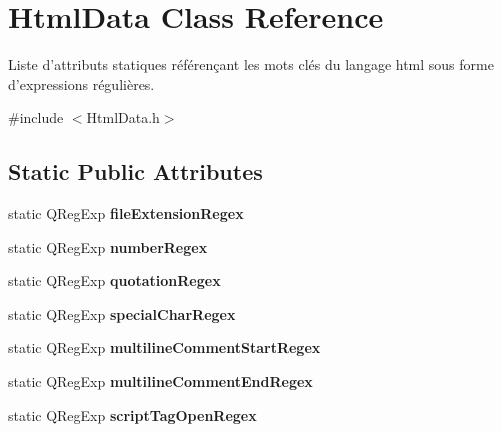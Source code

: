\hypertarget{class_html_data}{
\section{HtmlData Class Reference}
\label{class_html_data}
}


Liste d'attributs statiques référençant les mots clés du langage html sous forme d'expressions régulières.  




{\ttfamily \#include $<$HtmlData.h$>$}

\subsection*{Static Public Attributes}
\begin{DoxyCompactItemize}
\item 
\hypertarget{class_html_data_a53d4343bf2355792487bd1ceeedc0a57}{
static QRegExp {\bfseries fileExtensionRegex}}
\label{class_html_data_a53d4343bf2355792487bd1ceeedc0a57}

\item 
\hypertarget{class_html_data_a61a992ef13a97ceef22069b0ec58844a}{
static QRegExp {\bfseries numberRegex}}
\label{class_html_data_a61a992ef13a97ceef22069b0ec58844a}

\item 
\hypertarget{class_html_data_a37858a0990780d206aa6e6cc4774e635}{
static QRegExp {\bfseries quotationRegex}}
\label{class_html_data_a37858a0990780d206aa6e6cc4774e635}

\item 
\hypertarget{class_html_data_aa50fcbc582f92abeb234b8c24247e953}{
static QRegExp {\bfseries specialCharRegex}}
\label{class_html_data_aa50fcbc582f92abeb234b8c24247e953}

\item 
\hypertarget{class_html_data_af5d059509e01282e98783ab1b6340cd4}{
static QRegExp {\bfseries multilineCommentStartRegex}}
\label{class_html_data_af5d059509e01282e98783ab1b6340cd4}

\item 
\hypertarget{class_html_data_a154d85cb494ea5c66ad4f1e946e8af21}{
static QRegExp {\bfseries multilineCommentEndRegex}}
\label{class_html_data_a154d85cb494ea5c66ad4f1e946e8af21}

\item 
\hypertarget{class_html_data_a1c939625065284c045d5be9ee8d943ee}{
static QRegExp {\bfseries scriptTagOpenRegex}}
\label{class_html_data_a1c939625065284c045d5be9ee8d943ee}


\end{DoxyCompactItemize}
